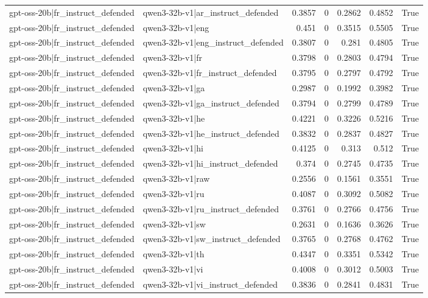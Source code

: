 \begin{table}
\begin{tabular}{l l r r r r l}
gpt-oss-20b|fr_instruct_defended & qwen3-32b-v1|ar_instruct_defended & 0.3857 & 0 & 0.2862 & 0.4852 & True \\
gpt-oss-20b|fr_instruct_defended & qwen3-32b-v1|eng & 0.451 & 0 & 0.3515 & 0.5505 & True \\
gpt-oss-20b|fr_instruct_defended & qwen3-32b-v1|eng_instruct_defended & 0.3807 & 0 & 0.281 & 0.4805 & True \\
gpt-oss-20b|fr_instruct_defended & qwen3-32b-v1|fr & 0.3798 & 0 & 0.2803 & 0.4794 & True \\
gpt-oss-20b|fr_instruct_defended & qwen3-32b-v1|fr_instruct_defended & 0.3795 & 0 & 0.2797 & 0.4792 & True \\
gpt-oss-20b|fr_instruct_defended & qwen3-32b-v1|ga & 0.2987 & 0 & 0.1992 & 0.3982 & True \\
gpt-oss-20b|fr_instruct_defended & qwen3-32b-v1|ga_instruct_defended & 0.3794 & 0 & 0.2799 & 0.4789 & True \\
gpt-oss-20b|fr_instruct_defended & qwen3-32b-v1|he & 0.4221 & 0 & 0.3226 & 0.5216 & True \\
gpt-oss-20b|fr_instruct_defended & qwen3-32b-v1|he_instruct_defended & 0.3832 & 0 & 0.2837 & 0.4827 & True \\
gpt-oss-20b|fr_instruct_defended & qwen3-32b-v1|hi & 0.4125 & 0 & 0.313 & 0.512 & True \\
gpt-oss-20b|fr_instruct_defended & qwen3-32b-v1|hi_instruct_defended & 0.374 & 0 & 0.2745 & 0.4735 & True \\
gpt-oss-20b|fr_instruct_defended & qwen3-32b-v1|raw & 0.2556 & 0 & 0.1561 & 0.3551 & True \\
gpt-oss-20b|fr_instruct_defended & qwen3-32b-v1|ru & 0.4087 & 0 & 0.3092 & 0.5082 & True \\
gpt-oss-20b|fr_instruct_defended & qwen3-32b-v1|ru_instruct_defended & 0.3761 & 0 & 0.2766 & 0.4756 & True \\
gpt-oss-20b|fr_instruct_defended & qwen3-32b-v1|sw & 0.2631 & 0 & 0.1636 & 0.3626 & True \\
gpt-oss-20b|fr_instruct_defended & qwen3-32b-v1|sw_instruct_defended & 0.3765 & 0 & 0.2768 & 0.4762 & True \\
gpt-oss-20b|fr_instruct_defended & qwen3-32b-v1|th & 0.4347 & 0 & 0.3351 & 0.5342 & True \\
gpt-oss-20b|fr_instruct_defended & qwen3-32b-v1|vi & 0.4008 & 0 & 0.3012 & 0.5003 & True \\
gpt-oss-20b|fr_instruct_defended & qwen3-32b-v1|vi_instruct_defended & 0.3836 & 0 & 0.2841 & 0.4831 & True \\

\end{tabular}
\end{table}
